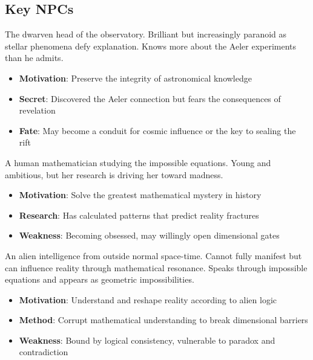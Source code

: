 \documentclass[11pt]{article}
\begin{document}
\subsection*{Key NPCs}

\begin{description}[leftmargin=*]
\item[Master Astronomer Thane Ironwright] The dwarven head of the observatory. Brilliant but increasingly paranoid as stellar phenomena defy explanation. Knows more about the Aeler experiments than he admits.
\begin{itemize}
\item \textbf{Motivation}: Preserve the integrity of astronomical knowledge
\item \textbf{Secret}: Discovered the Aeler connection but fears the consequences of revelation
\item \textbf{Fate}: May become a conduit for cosmic influence or the key to sealing the rift
\end{itemize}

\item[Scholar Elena Vasquez] A human mathematician studying the impossible equations. Young and ambitious, but her research is driving her toward madness.
\begin{itemize}
\item \textbf{Motivation}: Solve the greatest mathematical mystery in history
\item \textbf{Research}: Has calculated patterns that predict reality fractures
\item \textbf{Weakness}: Becoming obsessed, may willingly open dimensional gates
\end{itemize}

\item[The Entity (Beyond the Void)] An alien intelligence from outside normal space-time. Cannot fully manifest but can influence reality through mathematical resonance. Speaks through impossible equations and appears as geometric impossibilities.
\begin{itemize}
\item \textbf{Motivation}: Understand and reshape reality according to alien logic
\item \textbf{Method}: Corrupt mathematical understanding to break dimensional barriers
\item \textbf{Weakness}: Bound by logical consistency, vulnerable to paradox and contradiction
\end{itemize}
\end{description}
\end{document}
